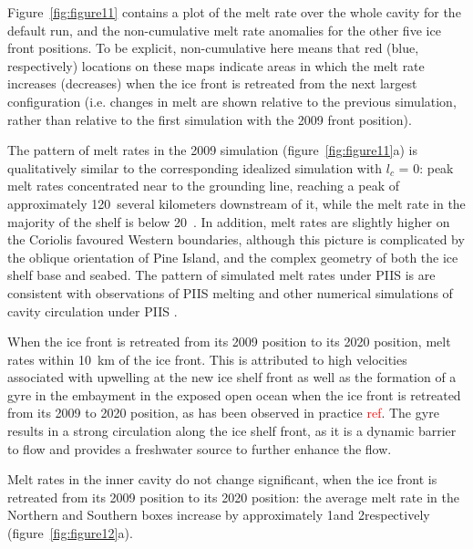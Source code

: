 \documentclass[draft]{agujournal2019}
\newcommand{\red}[1]{\textcolor{red}{#1}}
\begin{document}
Figure~\ref{fig:figure11} contains a plot of the melt rate over the whole cavity for the default run, and the non-cumulative melt rate anomalies for the other five ice front positions. To be explicit, non-cumulative here means that red (blue, respectively) locations on these maps indicate areas in which the melt rate increases (decreases) when the ice front is retreated from the next largest configuration (i.e. changes in melt are shown relative to the previous simulation, rather than  relative to the first simulation with the 2009 front position). 

The pattern of melt rates in the 2009 simulation (figure~\ref{fig:figure11}a) is qualitatively similar to the corresponding idealized simulation with $l_c$ = 0: peak melt rates concentrated near to the grounding line, reaching a peak of approximately 120~\mpryr several kilometers downstream of it, while the melt rate in the majority of the shelf is below 20~\mpryr.  In addition, melt rates are slightly higher on the Coriolis favoured Western boundaries, although this picture is complicated by the oblique orientation of Pine Island, and the complex geometry of both the ice shelf base and seabed. The pattern of simulated melt rates under PIIS is are consistent with observations of PIIS melting \cite{Dutrieux2014Science} and other numerical simulations of cavity circulation under PIIS \cite{Heimbach2012AnnGlac}.

When the ice front is retreated from its 2009 position to its 2020 position, melt rates within 10~km of the ice front. This is attributed to high velocities associated with upwelling at the new ice shelf front as well as the formation of a gyre in the embayment in the exposed open ocean when the ice front is retreated from its 2009 to 2020 position, as has been observed in practice \red{ref}. The gyre results in a strong circulation along the ice shelf front, as it is a dynamic barrier to flow and provides a freshwater source to further enhance the flow. 

Melt rates in the inner cavity do not change significant, when the ice front is retreated from its 2009 position to its 2020 position: the average melt rate in the Northern and Southern boxes increase by approximately 1\mpryr and 2\mpryr respectively (figure~\ref{fig:figure12}a).
\end{document}
